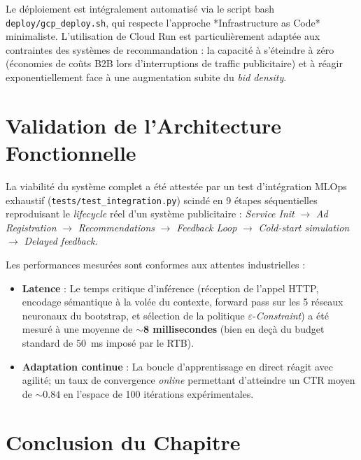 Le déploiement est intégralement automatisé via le script bash \texttt{deploy/gcp\_deploy.sh}, qui respecte l'approche *Infrastructure as Code* minimaliste. L'utilisation de Cloud Run est particulièrement adaptée aux contraintes des systèmes de recommandation : la capacité à s'éteindre à zéro (économies de coûts B2B lors d'interruptions de traffic publicitaire) et à réagir exponentiellement face à une augmentation subite du \textit{bid density}.

\section{Validation de l'Architecture Fonctionnelle}

La viabilité du système complet a été attestée par un test d'intégration MLOps exhaustif (\texttt{tests/test\_integration.py}) scindé en 9 étapes séquentielles reproduisant le \textit{lifecycle} réel d'un système publicitaire : \textit{Service Init} $\rightarrow$ \textit{Ad Registration} $\rightarrow$ \textit{Recommendations} $\rightarrow$ \textit{Feedback Loop} $\rightarrow$ \textit{Cold-start simulation} $\rightarrow$ \textit{Delayed feedback}.

Les performances mesurées sont conformes aux attentes industrielles :
\begin{itemize}
    \item \textbf{Latence} : Le temps critique d'inférence (réception de l'appel HTTP, encodage sémantique à la volée du contexte, forward pass sur les 5 réseaux neuronaux du bootstrap, et sélection de la politique $\varepsilon$-\textit{Constraint}) a été mesuré à une moyenne de $\sim$\textbf{8 millisecondes} (bien en deçà du budget standard de 50~ms imposé par le RTB).
    \item \textbf{Adaptation continue} : La boucle d'apprentissage en direct réagit avec agilité; un taux de convergence \textit{online} permettant d'atteindre un CTR moyen de $\sim 0.84$ en l'espace de 100 itérations expérimentales.
\end{itemize}

\section*{Conclusion du Chapitre}


